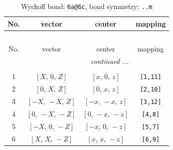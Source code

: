 \documentclass[fleqn,8pt]{jsarticle}
\begin{document}
\begin{longtable}{cccc}
\caption{Wyckoff bond: {\tt 6a@6c}, bond symmetry: {\tt ..m}}
 \\
 \hline \hline
No. & vector & center & mapping \\ \hline \endfirsthead

\multicolumn{3}{l}{\tablename\ \thetable{}} \\
 \hline \hline
No. & vector & center & mapping \\ \hline \endhead

 \hline \hline
\multicolumn{3}{r}{\footnotesize\it continued ...} \\ \endfoot

 \hline \hline
\multicolumn{3}{r}{} \\ \endlastfoot

1 & $\left[ X,\, 0,\, Z \right]$ & $\left[ x,\, 0,\, z \right]$ & {\tt [1,11]} \\ \hline
2 & $\left[ 0,\, X,\, Z \right]$ & $\left[ 0,\, x,\, z \right]$ & {\tt [2,10]} \\ \hline
3 & $\left[ - X,\, - X,\, Z \right]$ & $\left[ - x,\, - x,\, z \right]$ & {\tt [3,12]} \\ \hline
4 & $\left[ 0,\, - X,\, - Z \right]$ & $\left[ 0,\, - x,\, - z \right]$ & {\tt [4,8]} \\ \hline
5 & $\left[ - X,\, 0,\, - Z \right]$ & $\left[ - x,\, 0,\, - z \right]$ & {\tt [5,7]} \\ \hline
6 & $\left[ X,\, X,\, - Z \right]$ & $\left[ x,\, x,\, - z \right]$ & {\tt [6,9]} \\
\end{longtable}
\renewcommand{\arraystretch}{1.2}
\end{document}
